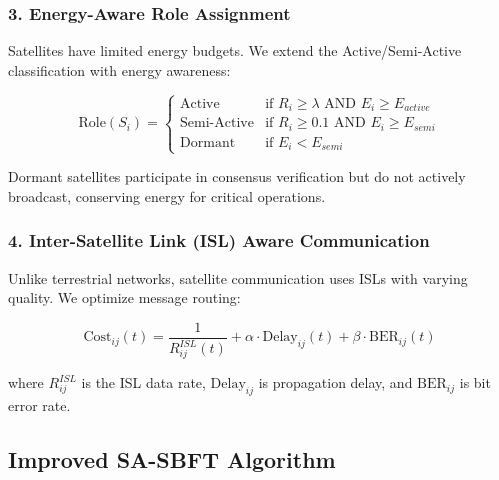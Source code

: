 \subsubsection{3. Energy-Aware Role Assignment}

Satellites have limited energy budgets. We extend the Active/Semi-Active classification with energy awareness:

\begin{equation}
\text{Role}(S_i) = 
\begin{cases}
\text{Active} & \text{if } R_i \geq \lambda \text{ AND } E_i \geq E_{active} \\
\text{Semi-Active} & \text{if } R_i \geq 0.1 \text{ AND } E_i \geq E_{semi} \\
\text{Dormant} & \text{if } E_i < E_{semi}
\end{cases}
\end{equation}

Dormant satellites participate in consensus verification but do not actively broadcast, conserving energy for critical operations.

\subsubsection{4. Inter-Satellite Link (ISL) Aware Communication}

Unlike terrestrial networks, satellite communication uses ISLs with varying quality. We optimize message routing:

\begin{equation}
\text{Cost}_{ij}(t) = \frac{1}{R^{ISL}_{ij}(t)} + \alpha \cdot \text{Delay}_{ij}(t) + \beta \cdot \text{BER}_{ij}(t)
\end{equation}

where $R^{ISL}_{ij}$ is the ISL data rate, $\text{Delay}_{ij}$ is propagation delay, and $\text{BER}_{ij}$ is bit error rate.

\subsection{Improved SA-SBFT Algorithm}


